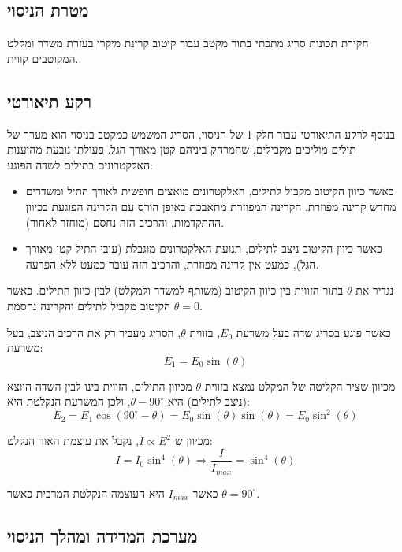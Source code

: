 \documentclass[14pt]{extarticle}
\begin{document}
\subsection*{מטרת הניסוי}
חקירת תכונות סריג מתכתי בתור מקטב עבור קיטוב קרינת מיקרו בעזרת משדר ומקלט המקוטבים קווית.

\subsection*{רקע תיאורטי}
בנוסף לרקע התיאורטי עבור חלק 1 של הניסוי,  הסריג המשמש כמקטב בניסוי הוא מערך של תילים מוליכים מקבילים, שהמרחק ביניהם קטן מאורך הגל.
פעולתו נובעת מהיענות האלקטרונים בתילים לשדה הפוגע:

\begin{itemize}
    \item 
כאשר כיוון הקיטוב מקביל לתילים, האלקטרונים מואצים חופשית לאורך התיל ומשדרים מחדש קרינה מפוזרת. הקרינה המפוזרת מתאבכת באופן הורס עם הקרינה הפוגעת בכיוון ההתקדמות, והרכיב הזה נחסם (מוחזר לאחור).
    \item
כאשר כיוון הקיטוב ניצב לתילים, תנועת האלקטרונים מוגבלת (עובי התיל קטן מאורך הגל), כמעט אין קרינה מפוזרת, והרכיב הזה עובר כמעט ללא הפרעה.
\end{itemize}

נגדיר את $\theta$ בתור הזווית בין כיוון הקיטוב (משותף למשדר ולמקלט) לבין כיוון התילים.
כאשר $\theta = 0$ הקיטוב מקביל לתילים והקרינה נחסמת.

כאשר פוגע בסריג שדה בעל משרעת $E_0$, בזווית $\theta$, הסריג מעביר רק את הרכיב הניצב, בעל משרעת:
\begin{equation}
    E_1 = E_0 \sin(\theta)
\end{equation}

מכיוון שציר הקליטה של המקלט נמצא בזווית $\theta$ מכיוון התילים, הזווית בינו לבין השדה היוצא (ניצב לתילים) היא $\theta - 90^\circ$, ולכן המשרעת הנקלטת היא:
\begin{equation}
    E_2 = E_1 \cos(90^\circ - \theta) = E_0 \sin(\theta) \sin(\theta) = E_0 \sin^2(\theta)
\end{equation}

מכיוון ש $I \propto E^2$, נקבל את עוצמת האור הנקלט:
\begin{equation}
    I = I_0 \sin^4(\theta) \Rightarrow \frac{I}{I_{max}} = \sin^4(\theta)
\end{equation}

כאשר $I_{max}$ היא העוצמה הנקלטת המרבית כאשר $\theta = 90^\circ$.

\subsection*{מערכת המדידה ומהלך הניסוי}
\end{document}
